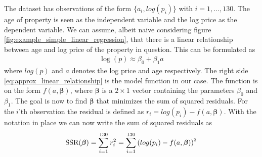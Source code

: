 The dataset has observations of the form $\{a_i, log(p_i)\}$ with $i = 1, \ldots, 130$. The age of property is seen as the independent variable and the log price as the dependent variable.
We can assume, albeit naive considering figure \ref{fig:example_simple_linear_regression}, that there is a linear relationship between age and log price of the property in question.
This can be formulated as
\begin{align}\label{eq:approx_linear_relationship}
    \log(p) \approx \beta_0 + \beta_1 a
\end{align}
where $log(p)$ and $a$ denotes the log price and age respectively.
The right side \eqref{eq:approx_linear_relationship} is the model function in our case.
The function is on the form $f(a, \boldsymbol{\beta})$, where $\boldsymbol{\beta}$ is a $2 \times 1$ vector containing the parameters $\beta_0$ and $\beta_1$.
The goal is now to find $\boldsymbol{\beta}$ that minimizes the sum of squared residuals.
For the $i$'th observation the residual is defined as $r_i = log(p_i) - f(a, \boldsymbol{\beta})$.
With the notation in place we can now write the sum of squared residuals as
\begin{align}\label{eq:SSR}
  \operatorname{\text{SSR}}(\boldsymbol{\beta}) = \sum_{i = 1}^{130} r_i^2 = \sum_{i = 1}^{130} \left( log(p_i) - f(a, \boldsymbol{\beta}) \right)^2
\end{align}

